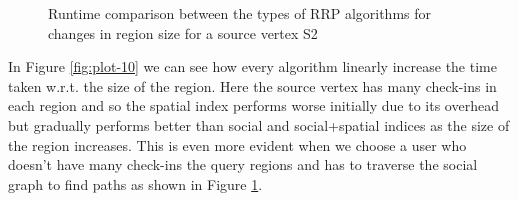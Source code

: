 \begin{figure*}[t]
\begin{subfigure}[t]{0.5\textwidth}
	\caption{Runtime comparison between the types of RRP algorithms for changes in region size for a source vertex S2}
	\label{fig:plot-11}
\end{subfigure}
\caption{Runtime comparison between the types of RRP algorithms for changes in region size for different source verteices}
\end{figure*}

In Figure \ref{fig:plot-10} we can see how every algorithm linearly increase the time taken w.r.t. the size of the region. Here the source vertex has many check-ins in each region and so the spatial index performs worse initially due to its overhead but gradually performs better than social and social+spatial indices as the size of the region increases. This is even more evident when we choose a user who doesn't have many check-ins the query regions and has to traverse the social graph to find paths as shown in Figure \ref{fig:plot-11}.
